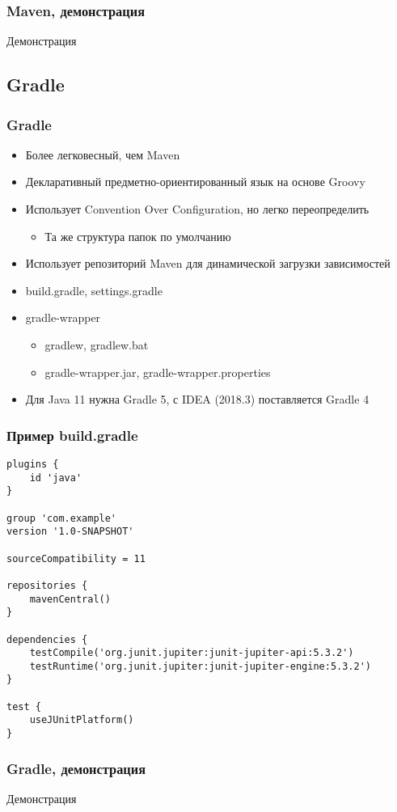 \documentclass[xetex,mathserif,serif]{beamer}
\begin{document}
	\begin{frame}
		\frametitle{Maven, демонстрация}
		\begin{center}
			\huge{Демонстрация}
		\end{center}
	\end{frame}

	\subsection{Gradle}

	\begin{frame}
		\frametitle{Gradle}
		\begin{itemize}
			\item Более легковесный, чем Maven
			\item Декларативный предметно-ориентированный язык на основе Groovy
			\item Использует Convention Over Configuration, но легко переопределить
			\begin{itemize}
				\item Та же структура папок по умолчанию
			\end{itemize}
			\item Использует репозиторий Maven для динамической загрузки зависимостей
			\item build.gradle, settings.gradle
			\item gradle-wrapper
			\begin{itemize}
				\item gradlew, gradlew.bat
				\item gradle-wrapper.jar, gradle-wrapper.properties
			\end{itemize}
			\item Для Java 11 нужна Gradle 5, с IDEA (2018.3) поставляется Gradle 4
		\end{itemize}
	\end{frame}

	\begin{frame}[fragile]
		\frametitle{Пример build.gradle}
		\begin{scriptsize}
			\begin{verbatim}
plugins {
    id 'java'
}

group 'com.example'
version '1.0-SNAPSHOT'

sourceCompatibility = 11

repositories {
    mavenCentral()
}

dependencies {
    testCompile('org.junit.jupiter:junit-jupiter-api:5.3.2')
    testRuntime('org.junit.jupiter:junit-jupiter-engine:5.3.2')
}

test {
    useJUnitPlatform()
}
			\end{verbatim}
		\end{scriptsize}
	\end{frame}

	\begin{frame}
		\frametitle{Gradle, демонстрация}
		\begin{center}
			\huge{Демонстрация}
		\end{center}
	\end{frame}
\end{document}
